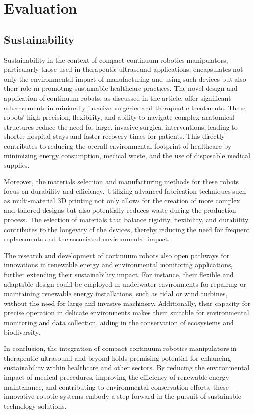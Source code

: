 \section{Evaluation}
\subsection{Sustainability}
Sustainability in the context of compact continuum robotics manipulators, particularly those used in therapeutic 
ultrasound applications, encapsulates not only the environmental impact of manufacturing and using such devices 
but also their role in promoting sustainable healthcare practices. The novel design and application of continuum 
robots, as discussed in the article, offer significant advancements in minimally invasive surgeries and therapeutic 
treatments. These robots' high precision, flexibility, and ability to navigate complex anatomical structures reduce 
the need for large, invasive surgical interventions, leading to shorter hospital stays and faster recovery times for 
patients. This directly contributes to reducing the overall environmental footprint of healthcare by minimizing energy 
consumption, medical waste, and the use of disposable medical supplies.

Moreover, the materials selection and manufacturing methods for these robots focus on durability and efficiency. Utilizing 
advanced fabrication techniques such as multi-material 3D printing not only allows for the creation of more complex and 
tailored designs but also potentially reduces waste during the production process. The selection of materials that balance 
rigidity, flexibility, and durability contributes to the longevity of the devices, thereby reducing the need for frequent 
replacements and the associated environmental impact. 

The research and development of continuum robots also open pathways for innovations in renewable energy and environmental 
monitoring applications, further extending their sustainability impact. For instance, their flexible and adaptable design 
could be employed in underwater environments for repairing or maintaining renewable energy installations, such as tidal 
or wind turbines, without the need for large and invasive machinery. Additionally, their capacity for precise operation 
in delicate environments makes them suitable for environmental monitoring and data collection, aiding in the conservation 
of ecosystems and biodiversity. 

In conclusion, the integration of compact continuum robotics manipulators in therapeutic ultrasound and beyond holds 
promising potential for enhancing sustainability within healthcare and other sectors. By reducing the environmental 
impact of medical procedures, improving the efficiency of renewable energy maintenance, and contributing to environmental 
conservation efforts, these innovative robotic systems embody a step forward in the pursuit of sustainable technology solutions. 







\newpage